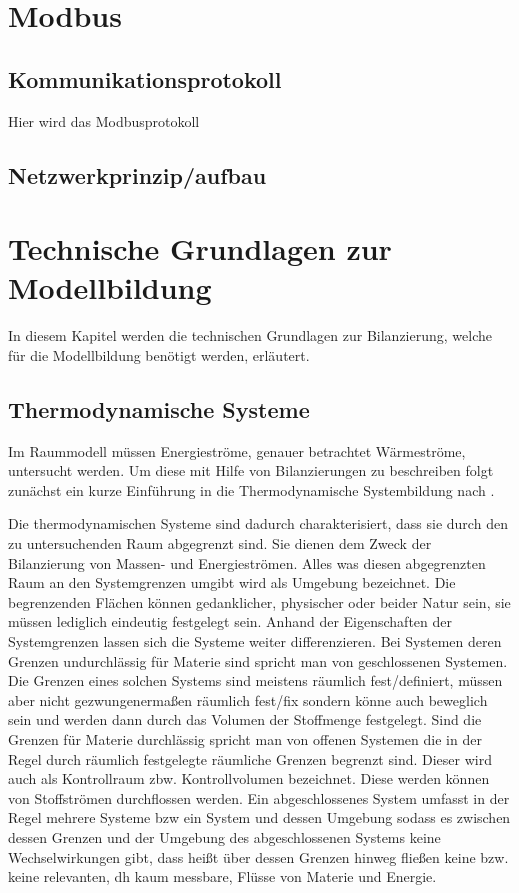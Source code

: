 \section{Modbus}
\label{sec:modbus}

\subsection{Kommunikationsprotokoll}
\label{sub:modbusprotokoll}
Hier wird das Modbusprotokoll

\subsection{Netzwerkprinzip/aufbau}
\label{sub:modbusnetzwerk}


\section{Technische Grundlagen zur Modellbildung}
\label{sec:grundlagenmodell}
In diesem Kapitel werden die technischen Grundlagen zur Bilanzierung, welche für die Modellbildung benötigt werden, erläutert.

\subsection{Thermodynamische Systeme}
Im Raummodell müssen Energieströme, genauer betrachtet Wärmeströme, untersucht werden. Um diese mit Hilfe von Bilanzierungen zu beschreiben folgt zunächst ein kurze Einführung in die Thermodynamische Systembildung nach \cite[S.~11ff.]{ba12}.


Die thermodynamischen Systeme sind dadurch charakterisiert, dass sie durch den zu untersuchenden Raum abgegrenzt sind. Sie dienen dem Zweck der Bilanzierung von Massen- und Energieströmen. Alles was diesen abgegrenzten Raum an den Systemgrenzen umgibt wird als Umgebung bezeichnet. Die begrenzenden Flächen können gedanklicher, physischer oder beider Natur sein, sie müssen lediglich eindeutig festgelegt sein.
Anhand der Eigenschaften der Systemgrenzen lassen sich die Systeme weiter differenzieren.
Bei Systemen deren Grenzen undurchlässig für Materie sind spricht man von geschlossenen Systemen. Die Grenzen eines solchen Systems sind meistens räumlich fest/definiert, müssen aber nicht gezwungenermaßen räumlich fest/fix sondern könne auch beweglich sein und werden dann durch das Volumen der Stoffmenge festgelegt.
Sind die Grenzen für Materie durchlässig spricht man von offenen Systemen die in der Regel durch räumlich festgelegte räumliche Grenzen begrenzt sind. Dieser wird auch als Kontrollraum zbw. Kontrollvolumen bezeichnet. Diese werden können von Stoffströmen durchflossen werden.
Ein abgeschlossenes System umfasst in der Regel mehrere Systeme \acrlong{bzw} ein System und dessen Umgebung sodass es zwischen dessen Grenzen und der Umgebung des abgeschlossenen Systems keine Wechselwirkungen gibt, dass heißt über dessen Grenzen hinweg fließen keine bzw. keine relevanten, dh kaum messbare, Flüsse von Materie und Energie.


